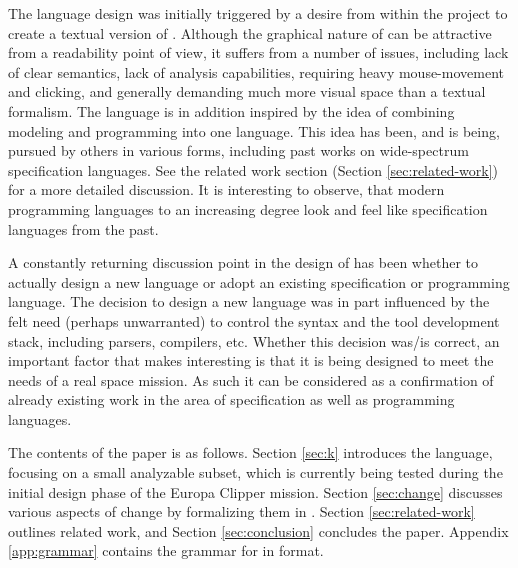 The \Klang{} language design was initially triggered by a desire from within
the \ems{} project to create a textual version of \sysml. Although the graphical
nature of \sysml{} can be attractive from a readability point of view, it 
suffers from a number of issues, including lack of clear semantics, lack of analysis 
capabilities, requiring heavy mouse-movement and clicking, and generally demanding
much more visual space than a textual formalism. The \Klang{} language is in addition 
inspired by the idea of combining modeling and programming into one
language. This idea has been, and is being, pursued by others in various forms, including past works on wide-spectrum specification languages. See the
related work section (Section \ref{sec:related-work}) for a more detailed 
discussion. It is interesting to observe, that modern programming languages to an increasing degree look and feel like specification languages from the past. 

A constantly returning discussion point in the design of \Klang{} has been whether to 
actually design a new language or adopt an existing specification or programming 
language. The decision to design a new language was in part influenced by the felt 
need (perhaps unwarranted) to control the syntax and the tool development stack,
including parsers, compilers, etc. Whether this decision was/is correct, an important 
factor that makes \Klang{} interesting is that it is being designed 
to meet the needs of a real space mission. As such it can be considered as
a confirmation of already existing work in the area of specification as well as 
programming languages.

The contents of the paper is as follows. 
Section \ref{sec:k} introduces the \Klang{} language, focusing on a small
analyzable subset, which is currently being tested during the initial 
design phase of the Europa
Clipper mission.
Section \ref{sec:change} discusses various aspects of change by formalizing
them in \Klang.
Section \ref{sec:related-work} outlines related work, and 
Section \ref{sec:conclusion} concludes the paper.
Appendix \ref{app:grammar} contains the grammar for \Klang{} in \antlr{} 
\cite{antlr} format.
